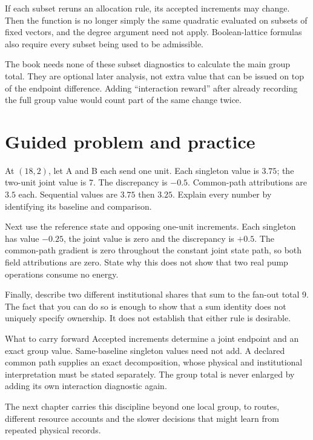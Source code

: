 If each subset reruns an allocation rule, its accepted increments may change. Then the function is no longer simply the same quadratic evaluated on subsets of fixed vectors, and the degree argument need not apply. Boolean-lattice formulas also require every subset being used to be admissible.

The book needs none of these subset diagnostics to calculate the main group total. They are optional later analysis, not extra value that can be issued on top of the endpoint difference. Adding ``interaction reward'' after already recording the full group value would count part of the same change twice.

\section{Guided problem and practice}
At $(18,2)$, let A and B each send one unit. Each singleton value is $3.75$; the two-unit joint value is 7. The discrepancy is $-0.5$. Common-path attributions are $3.5$ each. Sequential values are $3.75$ then $3.25$. Explain every number by identifying its baseline and comparison.

Next use the reference state and opposing one-unit increments. Each singleton has value $-0.25$, the joint value is zero and the discrepancy is $+0.5$. The common-path gradient is zero throughout the constant joint state path, so both field attributions are zero. State why this does not show that two real pump operations consume no energy.

Finally, describe two different institutional shares that sum to the fan-out total 9. The fact that you can do so is enough to show that a sum identity does not uniquely specify ownership. It does not establish that either rule is desirable.

\begin{intuitionbox}{What to carry forward}
Accepted increments determine a joint endpoint and an exact group value. Same-baseline singleton values need not add. A declared common path supplies an exact decomposition, whose physical and institutional interpretation must be stated separately. The group total is never enlarged by adding its own interaction diagnostic again.
\end{intuitionbox}

The next chapter carries this discipline beyond one local group, to routes, different resource accounts and the slower decisions that might learn from repeated physical records.
